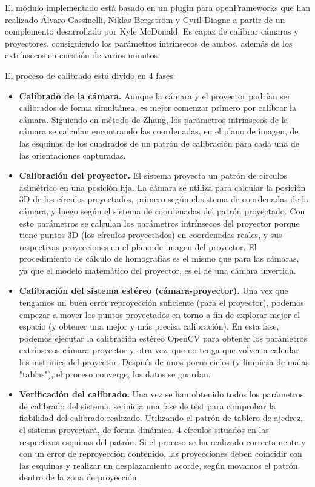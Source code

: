 El módulo implementado está basado en un plugin para openFrameworks que han realizado Álvaro Cassinelli, Niklas Bergström y Cyril Diagne a partir de un complemento desarrollado por Kyle McDonald. Es capaz de calibrar cámaras y proyectores, consiguiendo los parámetros intrínsecos de ambos, además de los extrínsecos en cuestión de varios minutos. 

El proceso de calibrado está divido en 4 fases:

\begin{itemize}
\item\textbf{Calibrado de la cámara. } Aunque la cámara y el proyector podrían ser calibrados de forma simultánea, es mejor comenzar primero por calibrar la cámara. Siguiendo en método de Zhang, los parámetros intrínsecos de la cámara se calculan encontrando las coordenadas, en el plano de imagen, de las esquinas de los cuadrados de un patrón de calibración para cada una de las orientaciones capturadas.

\item\textbf{Calibración del proyector. } El sistema proyecta un patrón de círculos asimétrico en una posición fija. La cámara se utiliza para calcular la posición 3D de los círculos proyectados, primero según el sistema de coordenadas de la cámara, y luego según el sistema de coordenadas del patrón proyectado. Con esto parámetros se calculan los parámetros intrínsecos del proyector porque tiene puntos 3D (los círculos proyectados) en coordenadas reales, y sus respectivas proyecciones en el plano de imagen del proyector. El procedimiento de cálculo de homografías es el mismo que para las cámaras, ya que el modelo matemático del proyector, es el de una cámara invertida. 

\item\textbf{Calibración del sistema estéreo (cámara-proyector). } Una vez que tengamos un buen error reproyección suficiente (para el proyector), podemos empezar a mover los puntos proyectados en torno a fin de explorar mejor el espacio (y obtener una mejor y más precisa calibración). En esta fase, podemos ejecutar la calibración estéreo OpenCV para obtener los parámetros extrínsecos cámara-proyector y otra vez, que no tenga que volver a calcular los instrinics del proyector. Después de unos pocos ciclos (y limpieza de malas "tablas"), el proceso converge, los datos se guardan.

\item\textbf{Verificación del calibrado. } Una vez se han obtenido todos los parámetros de calibrado del sistema, se inicia una fase de test para comprobar la fiabilidad del calibrado realizado. Utilizando el patrón de tablero de ajedrez, el sistema proyectará, de forma dinámica, 4 círculos situados en las respectivas esquinas del patrón. Si el proceso se ha realizado correctamente y con un error de reproyección contenido, las proyecciones deben coincidir con las esquinas y realizar un desplazamiento acorde, según movamos el patrón dentro de la zona de proyección 
\end{itemize}

